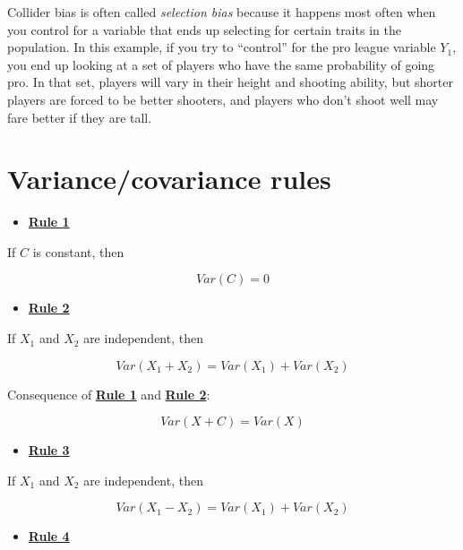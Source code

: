 \documentclass[
]{book}
\providecommand{\tightlist}{%
  \setlength{\itemsep}{0pt}\setlength{\parskip}{0pt}}
\begin{document}
Collider bias is often called \emph{selection bias} because it happens most often when you control for a variable that ends up selecting for certain traits in the population. In this example, if you try to ``control'' for the pro league variable \(Y_{1}\), you end up looking at a set of players who have the same probability of going pro. In that set, players will vary in their height and shooting ability, but shorter players are forced to be better shooters, and players who don't shoot well may fare better if they are tall.

\hypertarget{appendix-appendix}{%
\appendix}


\hypertarget{appendix-rules}{%
\chapter{Variance/covariance rules}\label{appendix-rules}}

\begin{itemize}
\tightlist
\item
  \href{./variance.html\#Rule1}{\textbf{Rule 1}}
\end{itemize}

If \(C\) is constant, then

\[
Var\left(C\right) = 0
\]

\begin{itemize}
\tightlist
\item
  \href{./variance.html\#Rule2}{\textbf{Rule 2}}
\end{itemize}

If \(X_{1}\) and \(X_{2}\) are independent, then

\[
Var\left(X_{1} + X_{2}\right) =
Var\left(X_{1}\right) + Var\left(X_{2}\right)
\]

Consequence of \href{./variance.html\#Rule1}{\textbf{Rule 1}} and \href{./variance.html\#Rule2}{\textbf{Rule 2}}:

\[
Var\left(X + C\right) = Var\left(X\right)
\]

\begin{itemize}
\tightlist
\item
  \href{./variance.html\#Rule3}{\textbf{Rule 3}}
\end{itemize}

If \(X_{1}\) and \(X_{2}\) are independent, then

\[
Var\left(X_{1} - X_{2}\right) =
Var\left(X_{1}\right) + Var\left(X_{2}\right)
\]

\begin{itemize}
\tightlist
\item
  \href{./variance.html\#Rule4}{\textbf{Rule 4}}
\end{itemize}
\end{document}
